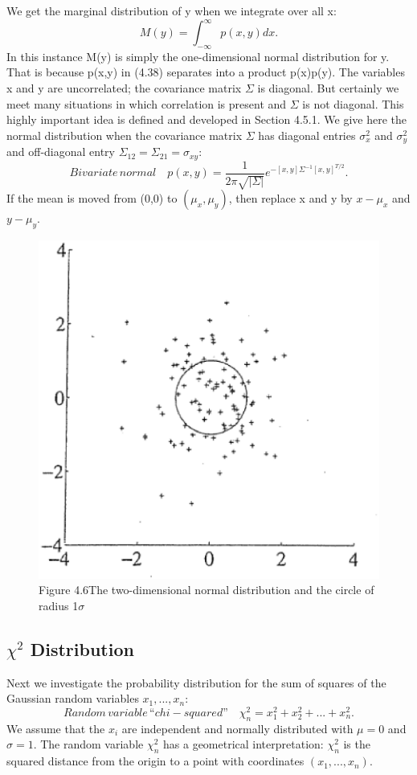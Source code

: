 	We get the marginal distribution of y when we integrate over all x:
	\begin{equation}
	M(y)=\int^\infty_{-\infty}p(x,y)dx.
	\end{equation}
	In this instance M(y) is simply the one-dimensional normal distribution for y. That is
	because p(x,y) in (4.38) separates into a product p(x)p(y). The variables x and y are
	uncorrelated; the covariance matrix $\Sigma$ is diagonal. But certainly we meet many situations in which correlation is present and $\Sigma$ is not diagonal. This highly important idea is defined and developed in Section 4.5.1. We give here the normal distribution when the covariance matrix $\Sigma$ has diagonal entries $\sigma^2_x$ and $\sigma^2_y$ and off-diagonal entry $\Sigma_{12}=\Sigma_{21}=\sigma_{xy}$:
	\begin{equation}
	Bivariate\, normal \quad 
	p(x,y)=\frac{1}{2\pi\sqrt{|\Sigma|}}e^{-[x,y]\Sigma^{-1}[x,y]^{T/2}}.
	\end{equation}
	If the mean is moved from (0,0) to $(\mu_x,\mu_y)$, then replace x and y by $x-\mu_x$ and $y-\mu_y$.	
	\begin{figure}[h]
		\centering
		\includegraphics[width=0.7\linewidth]{TeX_files/Part02/chapter04/image/4-6}
		\caption{Figure 4.6\;The two-dimensional normal distribution and the circle of radius 1$\sigma$}
		\label{fig:4-6}
	\end{figure}
	
	\subsection{$\chi^2$ Distribution}
	Next we investigate the probability distribution for the sum of squares of the Gaussian
	random variables $x_1,...,x_n$:
	\begin{equation*}
	Random\, variable\,“chi-squared”\quad
	\chi^2_n=x^2_1+x^2_2+...+x^2_n.
	\end{equation*}
	We assume that the $x_i$ are independent and normally distributed with $\mu=0$ and $\sigma=1$.
	The random variable $\chi^2_n$ has a geometrical interpretation: $\chi^2_n$ is the squared distance from
	the origin to a point with coordinates $(x_1,...,x_n)$.
	
